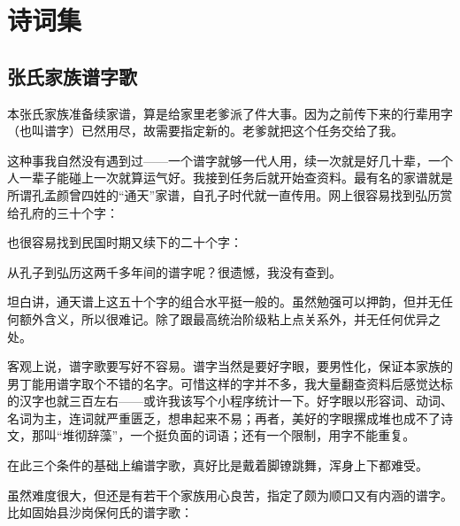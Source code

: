 \newpage
\chapter{诗词集}


\section{张氏家族谱字歌}
本张氏家族准备续家谱，算是给家里老爹派了件大事。因为之前传下来的行辈用字（也叫谱字）已然用尽，故需要指定新的。老爹就把这个任务交给了我。

这种事我自然没有遇到过——一个谱字就够一代人用，续一次就是好几十辈，一个人一辈子能碰上一次就算运气好。我接到任务后就开始查资料。最有名的家谱就是所谓孔孟颜曾四姓的“通天”家谱，自孔子时代就一直传用。网上很容易找到弘历赏给孔府的三十个字：


也很容易找到民国时期又续下的二十个字：


从孔子到弘历这两千多年间的谱字呢？很遗憾，我没有查到。

坦白讲，通天谱上这五十个字的组合水平挺一般的。虽然勉强可以押韵，但并无任何额外含义，所以很难记。除了跟最高统治阶级粘上点关系外，并无任何优异之处。

客观上说，谱字歌要写好不容易。谱字当然是要好字眼，要男性化，保证本家族的男丁能用谱字取个不错的名字。可惜这样的字并不多，我大量翻查资料后感觉达标的汉字也就三百左右——或许我该写个小程序统计一下。好字眼以形容词、动词、名词为主，连词就严重匮乏，想串起来不易；再者，美好的字眼摞成堆也成不了诗文，那叫“堆彻辞藻”，一个挺负面的词语；还有一个限制，用字不能重复。

在此三个条件的基础上编谱字歌，真好比是戴着脚镣跳舞，浑身上下都难受。

虽然难度很大，但还是有若干个家族用心良苦，指定了颇为顺口又有内涵的谱字。比如固始县沙岗保何氏的谱字歌：


